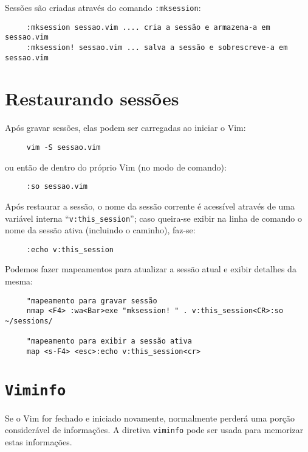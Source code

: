 Sessões são criadas através do comando \verb|:mksession|:

\begin{verbatim}
     :mksession sessao.vim .... cria a sessão e armazena-a em sessao.vim
     :mksession! sessao.vim ... salva a sessão e sobrescreve-a em sessao.vim
\end{verbatim}

\section{Restaurando sessões}

Após gravar sessões, elas podem ser carregadas ao iniciar o Vim:

\begin{verbatim}
     vim -S sessao.vim
\end{verbatim}

ou então de dentro do próprio Vim (no modo de comando):

\begin{verbatim}
     :so sessao.vim
\end{verbatim}

Após restaurar a sessão, o nome da sessão corrente é acessível através de uma
variável interna ``\verb+v:this_session+''; caso queira-se exibir na linha de
comando o nome da sessão ativa (incluindo o caminho), faz-se:

\begin{verbatim}
     :echo v:this_session
\end{verbatim}

Podemos fazer mapeamentos para atualizar a sessão atual e exibir detalhes da
mesma:

\begin{verbatim}
     "mapeamento para gravar sessão
     nmap <F4> :wa<Bar>exe "mksession! " . v:this_session<CR>:so ~/sessions/

     "mapeamento para exibir a sessão ativa
     map <s-F4> <esc>:echo v:this_session<cr>
\end{verbatim}

\section{\texttt{Viminfo}}\label{sec:Viminfo}

Se o Vim for fechado e iniciado novamente, normalmente perderá uma porção
considerável de informações. A diretiva {\tt viminfo} pode ser usada para
memorizar estas informações.

